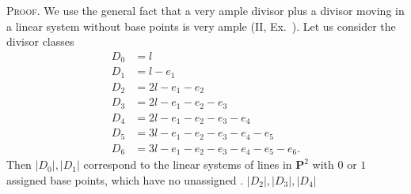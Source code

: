 {\smallskip
\noindent\textsc{Proof.} We use the general fact that a very ample divisor plus a divisor moving in a linear system without base points is very ample (II, Ex.~). Let us consider the divisor classes
\[
\begin{aligned}
D_0&=l\\
D_1&=l-e_1\\
D_2&=2l-e_1-e_2\\
D_3&=2l-e_1-e_2-e_3\\
D_4&=2l-e_1-e_2-e_3-e_4\\
D_5&=3l-e_1-e_2-e_3-e_4-e_5\\
D_6&=3l-e_1-e_2-e_3-e_4-e_5-e_6.
\end{aligned}
\]
Then $|D_0|,|D_1|$ correspond to the linear systems of lines in $\mathbf P^2$ with $0$ or $1$ assigned base points, which have no unassigned . $|D_2|,|D_3|,|D_4|$}
